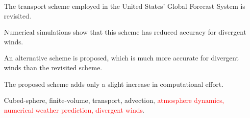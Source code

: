 \documentclass[preprint,12pt]{elsarticle}
\begin{document}
\begin{frontmatter}
\begin{highlights}
\item The transport scheme employed in the United States' Global Forecast System is revisited.
\item Numerical simulations show that this scheme has reduced accuracy for divergent winds.
\item  An alternative scheme is proposed, which is much more accurate for divergent winds than the revisited scheme.
\item The proposed scheme adds only a slight increase in computational effort.
\end{highlights}

\begin{keyword}
Cubed-sphere,
finite-volume,
transport,
advection,
\textcolor{red}{
atmosphere dynamics,
numerical weather prediction,
divergent winds}.
\end{keyword}

\end{frontmatter}
\end{document}
